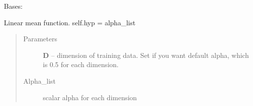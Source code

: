 \documentclass[letterpaper,10pt,english]{sphinxmanual}
\begin{document}

\begin{fulllineitems}
\label{pyGPs.Core:pyGPs.Core.mean.Linear}
Bases: {\hyperref[pyGPs.Core:pyGPs.Core.mean.Mean]{}}

Linear mean function. self.hyp = alpha\_list
\begin{quote}\begin{description}
\item[{Parameters}] \leavevmode
\textbf{D} -- dimension of training data. Set if you want default alpha, which is 0.5 for each dimension.

\item[{Alpha\_list }] \leavevmode
scalar alpha for each dimension

\end{description}\end{quote}

\begin{fulllineitems}
\label{pyGPs.Core:pyGPs.Core.mean.Linear.getDerMatrix}
\end{fulllineitems}


\begin{fulllineitems}
\label{pyGPs.Core:pyGPs.Core.mean.Linear.getMean}
\end{fulllineitems}


\end{fulllineitems}

\end{document}
